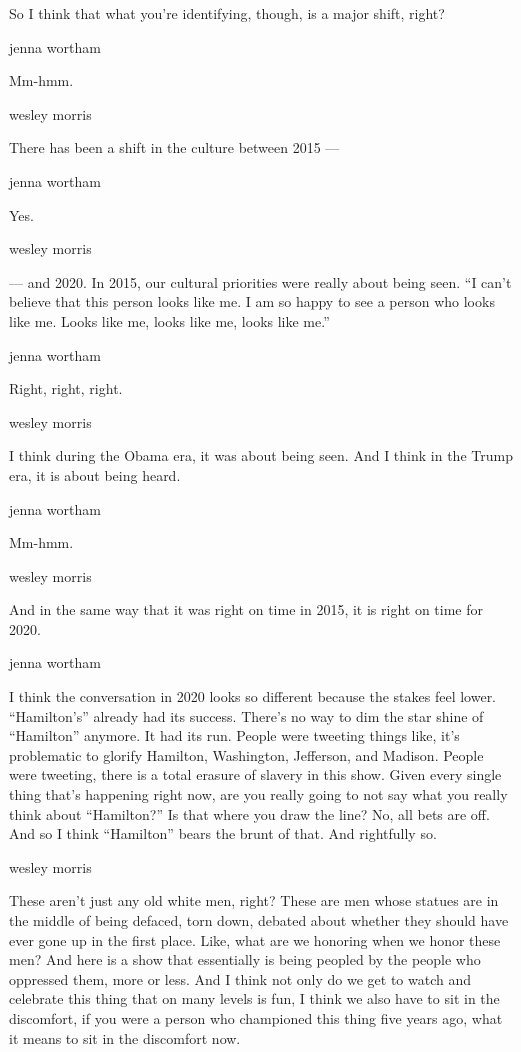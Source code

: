 So I think that what you're identifying, though, is a major shift,
right?

jenna wortham

Mm-hmm.

wesley morris

There has been a shift in the culture between 2015 ---

jenna wortham

Yes.

wesley morris

--- and 2020. In 2015, our cultural priorities were really about being
seen. ``I can't believe that this person looks like me. I am so happy to
see a person who looks like me. Looks like me, looks like me, looks like
me.''

jenna wortham

Right, right, right.

wesley morris

I think during the Obama era, it was about being seen. And I think in
the Trump era, it is about being heard.

jenna wortham

Mm-hmm.

wesley morris

And in the same way that it was right on time in 2015, it is right on
time for 2020.

jenna wortham

I think the conversation in 2020 looks so different because the stakes
feel lower. ``Hamilton's'' already had its success. There's no way to
dim the star shine of ``Hamilton'' anymore. It had its run. People were
tweeting things like, it's problematic to glorify Hamilton, Washington,
Jefferson, and Madison. People were tweeting, there is a total erasure
of slavery in this show. Given every single thing that's happening right
now, are you really going to not say what you really think about
``Hamilton?'' Is that where you draw the line? No, all bets are off. And
so I think ``Hamilton'' bears the brunt of that. And rightfully so.

wesley morris

These aren't just any old white men, right? These are men whose statues
are in the middle of being defaced, torn down, debated about whether
they should have ever gone up in the first place. Like, what are we
honoring when we honor these men? And here is a show that essentially is
being peopled by the people who oppressed them, more or less. And I
think not only do we get to watch and celebrate this thing that on many
levels is fun, I think we also have to sit in the discomfort, if you
were a person who championed this thing five years ago, what it means to
sit in the discomfort now.

